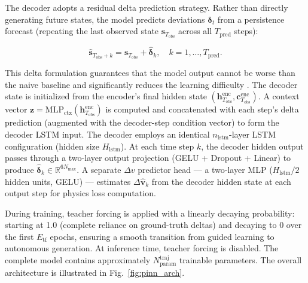 \documentclass[a4paper,fleqn]{cas-dc}
\begin{document}
The decoder adopts a residual delta prediction strategy. Rather than directly generating future states, the model predicts deviations $\bm{\delta}_t$ from a persistence forecast (repeating the last observed state $\bm{s}_{T_{\text{obs}}}$ across all $T_{\text{pred}}$ steps):

\begin{equation}
    \hat{\bm{s}}_{T_{\text{obs}} + k} = \bm{s}_{T_{\text{obs}}} + \hat{\bm{\delta}}_k, \quad k = 1, \dots, T_{\text{pred}}.
\end{equation}

This delta formulation guarantees that the model output cannot be worse than the naive baseline and significantly reduces the learning difficulty \cite{zhou2023lstm}. The decoder state is initialized from the encoder's final hidden state $(\bm{h}_{T_{\text{obs}}}^{\text{enc}}, \bm{c}_{T_{\text{obs}}}^{\text{enc}})$. A context vector $\bm{z} = \text{MLP}_{\text{ctx}}(\bm{h}_{T_{\text{obs}}}^{\text{enc}})$ is computed and concatenated with each step's delta prediction (augmented with the decoder-step condition vector) to form the decoder LSTM input. The decoder employs an identical $n_{\text{lstm}}$-layer LSTM configuration (hidden size $H_{\text{lstm}}$). At each time step $k$, the decoder hidden output passes through a two-layer output projection (GELU + Dropout + Linear) to produce $\hat{\bm{\delta}}_k \in \mathbb{R}^{6 N_{\max}}$. A separate $\Delta v$ predictor head --- a two-layer MLP ($H_{\text{lstm}}/2$ hidden units, GELU) --- estimates $\Delta \hat{\bm{v}}_k$ from the decoder hidden state at each output step for physics loss computation.

During training, teacher forcing is applied with a linearly decaying probability: starting at 1.0 (complete reliance on ground-truth deltas) and decaying to 0 over the first $E_{\text{tf}}$ epochs, ensuring a smooth transition from guided learning to autonomous generation. At inference time, teacher forcing is disabled. The complete model contains approximately $N_{\text{param}}^{\text{traj}}$ trainable parameters. The overall architecture is illustrated in Fig.~\ref{fig:pinn_arch}.
\end{document}
